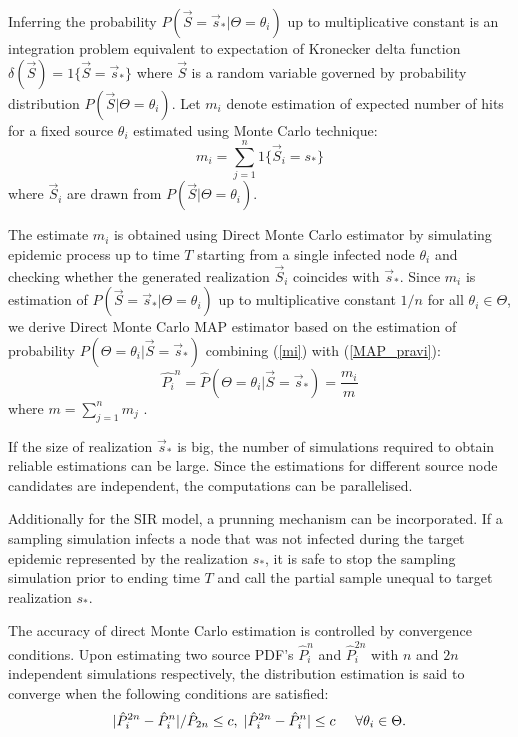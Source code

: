 \documentclass[times, utf8, diplomski]{fer}
\begin{document}
Inferring the probability  $P(\vec S = \vec s_* | \Theta = \theta_i)$ up to multiplicative constant is an integration problem equivalent to expectation of Kronecker delta function
 $\delta(\vec S) = 1\{\vec S = \vec s_{*}\}$ where $\vec S$ is a random variable governed by probability distribution $P(\vec S  | \Theta = \theta_i)$. 
 Let $m_i$ denote estimation of expected number of hits for a fixed source $\theta_i$ estimated using Monte Carlo technique:
\begin{equation}
 m_i = \sum_{j = 1}^{n} 1\{\vec S_i = s_{*}\}
\label{mi}
\end{equation}
where $\vec S_i$ are drawn from $P(\vec S | \Theta = \theta_i)$. 

The estimate $m_i$ is obtained using Direct Monte Carlo estimator by simulating epidemic process up to time $T$ starting from a single infected node $\theta_i$ and checking whether the generated realization $\vec S_i$ coincides with $\vec s_*$. Since $m_i$ is estimation of $P(\vec S = \vec s_* | \Theta = \theta_i)$ up to multiplicative constant $1/n$ for all $\theta_i \in \Theta$, we derive Direct Monte Carlo MAP estimator based on the estimation of probability $P(\Theta = \theta_i | \vec S = \vec s_*)$ combining (\ref{mi}) with (\ref{MAP_pravi}): 
\begin{equation}
\hat{P_i}^n = \hat{P}(\Theta = \theta_i | \vec S = \vec s_*) = \frac{m_i}{m}
\end{equation}
where $m = \sum_{j = 1}^{n} m_j$ .

If the size of realization $\vec s_*$ is big, the number of simulations required to obtain reliable estimations can be large. Since the estimations for different source node candidates are independent, the computations can be parallelised.  

Additionally for the SIR model, a prunning mechanism can be incorporated. If a sampling simulation infects a node that was not infected during the target epidemic  represented by the realization $s_*$, it is safe to stop the sampling simulation prior to ending time $T$ and call the partial sample unequal to target realization $s_*$.

The accuracy of direct Monte Carlo estimation is controlled by convergence conditions. Upon estimating two source PDF's $\hat{P}_i^n$ and $\hat{P}_i^{2n}$ with $n$ and $2n$ independent simulations respectively, the distribution estimation is said to converge when the following conditions are satisfied:
\begin{equation}
| \hat{P}_i^{2n} - \hat{P}_i^{n} | / \hat{P}_{2n} \leq c, \hspace{1mm} | \hat{P}_i^{2n} - \hat{P}_i^{n} | \leq c \hspace{5mm} \forall \theta_i \in \Theta.
\label{DMCConv}
\end{equation}
\end{document}
